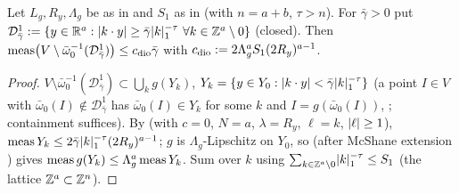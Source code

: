 \begin{lemma}\label{bpP:p5:dio-one}
Let $L_g,R_y,\Lambda_g$ be as in  and $S_1$ as in  (with $n=a+b$, $\tau>n$). For $\bar\gamma>0$ put $\mathcal D^1_{\bar\gamma}:=\{y\in\mathbb{R}^a:\lvert k\cdot y\rvert\ge\bar\gamma\lvert k\rvert_1^{-\tau}\ \forall k\in\mathbb{Z}^a\setminus0\}$ (closed). Then $\operatorname{meas}\bigl(V\setminus\bar\omega_0^{-1}(\mathcal D^1_{\bar\gamma})\bigr)\le c_{\rm dio}\bar\gamma$ with $c_{\rm dio}:=2\Lambda_g^aS_1(2R_y)^{a-1}$.
\end{lemma}
\begin{proof}
$V\setminus\bar\omega_0^{-1}(\mathcal D^1_{\bar\gamma})\subset\bigcup_kg(Y_k)$, $Y_k=\{y\in Y_0:\lvert k\cdot y\rvert<\bar\gamma\lvert k\rvert_1^{-\tau}\}$ (a point $I\in V$ with $\bar\omega_0(I)\notin\mathcal D^1_{\bar\gamma}$ has $\bar\omega_0(I)\in Y_k$ for some $k$ and $I=g(\bar\omega_0(I))$, ; containment suffices). By  (with $c=0$, $N=a$, $\lambda=R_y$, $\ell=k$, $\lvert \ell\rvert\ge1$), $\operatorname{meas} Y_k\le2\bar\gamma\lvert k\rvert_1^{-\tau}(2R_y)^{a-1}$; $g$ is $\Lambda_g$-Lipschitz on $Y_0$, so  (after McShane extension ) gives $\operatorname{meas} g(Y_k)\le\Lambda_g^a\operatorname{meas} Y_k$. Sum over $k$ using $\sum_{k\in\mathbb{Z}^a\setminus0}\lvert k\rvert_1^{-\tau}\le S_1$ (the lattice $\mathbb{Z}^a\subset\mathbb{Z}^n$).
\end{proof}

